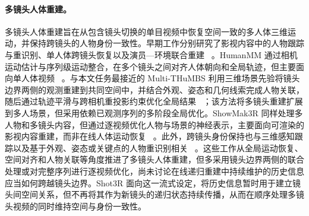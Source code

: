 \paragraph{多镜头人体重建。}
多镜头人体重建旨在从包含镜头切换的单目视频中恢复空间一致的多人体三维运动，并保持跨镜头的人物身份一致性。早期工作分别研究了影视内容中的人物跟踪与重识别、单人体跨镜头恢复以及演员—环境联合重建
~\citep{pavlakos2022tvtracking,pavlakos2022multishot,pavlakos2022tvreconstruction}。HumanMM 通过相机运动估计与序列级运动整合，在多个镜头之间对齐人体朝向和全局轨迹，但主要面向单人体视频
~\citep{zhang2025humanmm}。与本文任务最接近的 Multi-THuMBS 利用三维场景先验将镜头边界两侧的观测重建到共同空间中，并结合外观、姿态和几何线索完成人物关联，随后通过轨迹平滑与跨相机重投影约束优化全局结果
~\citep{on2026multithumbs}；该方法将多镜头重建扩展到多人场景，但采用依赖已观测序列的多阶段全局优化。ShowMak3R 同样处理多人物和多镜头内容，但通过逐视频优化人物与场景的神经表示，主要面向可渲染的影视内容重建，而非在线人体运动恢复
~\citep{kim2025showmak3r}。此外，跨镜头身份保持也与三维感知跟踪以及基于外观、姿态或关键点的人物重识别相关
~\citep{rajasegaran2022phalp,he2021transreid,yuan2025pose2id,somers2024kpr}。这些工作从全局运动恢复、空间对齐和人物关联等角度推进了多镜头人体重建，但多采用镜头边界两侧的联合处理或对完整序列进行逐视频优化，尚未讨论在线递归重建中持续维护的历史信息应当如何跨越镜头边界。Shot3R 面向这一流式设定，将历史信息暂时用于建立镜头间空间关系，但不再将其作为新镜头的递归状态持续传播，从而在顺序处理多镜头视频的同时维持空间与身份一致性。
